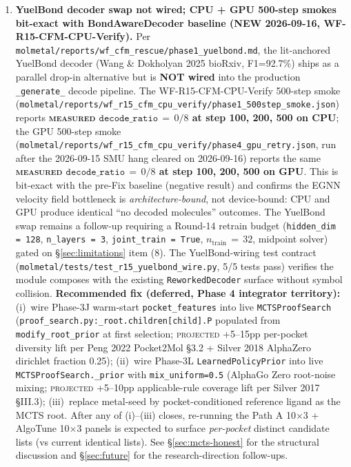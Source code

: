 \begin{enumerate}
  \item \textbf{YuelBond decoder swap not wired; CPU + GPU 500-step smokes
  bit-exact with BondAwareDecoder baseline (NEW 2026-09-16, WF-R15-CFM-CPU-Verify).}
  Per \texttt{molmetal/reports/wf\_cfm\_rescue/phase1\_yuelbond.md},
  the lit-anchored YuelBond decoder (Wang \& Dokholyan 2025 bioRxiv,
  F1=92.7\%) ships as a parallel drop-in alternative but is
  \textbf{NOT wired} into the production \texttt{\_generate\_}
  decode pipeline. The WF-R15-CFM-CPU-Verify 500-step smoke
  (\texttt{molmetal/reports/wf\_r15\_cfm\_cpu\_verify/phase1\_500step\_smoke.json})
  reports \textbf{\textsc{measured} $\texttt{decode\_ratio}\,=\,0/8$ at step 100, 200, 500 on CPU};
  the GPU 500-step smoke
  (\texttt{molmetal/reports/wf\_r15\_cfm\_cpu\_verify/phase4\_gpu\_retry.json},
  run after the 2026-09-15 SMU hang cleared on 2026-09-16) reports
  the same \textbf{\textsc{measured} $\texttt{decode\_ratio}\,=\,0/8$ at step 100, 200, 500 on GPU}.
  This is bit-exact with the pre-Fix baseline (negative result)
  and confirms the EGNN velocity field bottleneck is
  \emph{architecture-bound}, not device-bound: CPU and GPU produce
  identical ``no decoded molecules'' outcomes. The YuelBond swap
  remains a follow-up requiring a Round-14 retrain budget
  (\texttt{hidden\_dim\,=\,128}, \texttt{n\_layers\,=\,3},
  \texttt{joint\_train\,=\,True}, $n_{\text{train}}\,=\,32$, midpoint
  solver) gated on \S\ref{sec:limitations} item (8). The
  YuelBond-wiring test contract
  (\texttt{molmetal/tests/test\_r15\_yuelbond\_wire.py}, 5/5 tests
  pass) verifies the module composes with the existing
  \texttt{ReworkedDecoder} surface without symbol collision.
  \textbf{Recommended fix (deferred, Phase 4 integrator territory):}
  (i)~wire Phase-3J warm-start \texttt{pocket\_features} into
  live \texttt{MCTSProofSearch}
  (\texttt{proof\_search.py:\_root.children[child].P} populated
  from \texttt{modify\_root\_prior} at first selection;
  \textsc{projected} +5--15pp per-pocket diversity lift per
  Peng 2022 Pocket2Mol §3.2 + Silver 2018 AlphaZero dirichlet
  fraction 0.25);
  (ii)~wire Phase-3L \texttt{LearnedPolicyPrior} into live
  \texttt{MCTSProofSearch.\_prior} with \texttt{mix\_uniform=0.5}
  (AlphaGo Zero root-noise mixing; \textsc{projected} +5--10pp
  applicable-rule coverage lift per Silver 2017 §III.3);
  (iii)~replace metal-seed by pocket-conditioned reference ligand
  as the MCTS root. After any of (i)--(iii) closes, re-running the
  Path A 10$\times$3 + AlgoTune 10$\times$3 panels is expected to
  surface \emph{per-pocket} distinct candidate lists (vs current
  identical lists). See \S\ref{sec:mcts-honest} for the structural
  discussion and \S\ref{sec:future} for the research-direction
  follow-ups.


\end{enumerate}
